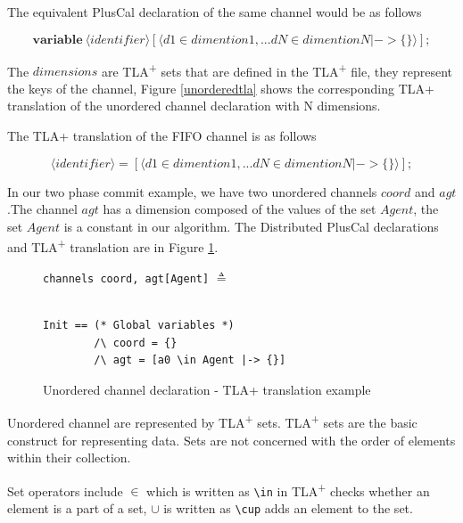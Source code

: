 \documentclass{thesul}
\newcommand{\tlaplus}{TLA\textsuperscript{+}\xspace}
\newcommand{\keyword}[1]{\textbf{#1}}
\newcommand{\entity}[1]{\ensuremath{\langle}#1\ensuremath{\rangle}}
\begin{document}
The equivalent PlusCal declaration of the same channel would be as follows

\[
 \keyword{variable}\ \entity{identifier}[\entity{d1 \in dimention1,... dN \in dimentionN |-> \{\}}];
\]

The $dimensions$ are \tlaplus sets that are defined in the \tlaplus file, they represent the keys of the channel, Figure \ref{unorderedtla} shows the corresponding TLA+ translation of the unordered channel declaration with N dimensions.



The TLA+ translation of the FIFO channel is as follows

\[
 \entity{identifier} = [\entity{d1 \in dimention1,... dN \in dimentionN |-> \{ \}}];
\]

In our two phase commit example, we have two unordered channels $coord$ and $agt$.The channel $agt$ has a dimension composed of the values of the set $Agent$, the set $Agent$ is a constant in our algorithm. The Distributed PlusCal declarations and \tlaplus translation are in Figure \ref{2pcchannels}.


\FloatBarrier
\begin{figure}[!h]

\begin{minipage}{.3\textwidth}

\lstinline|channels coord, agt[Agent]| $\triangleq$ \\\\
\end{minipage}\hfill
\begin{minipage}{.7\textwidth}
\begin{lstlisting}[frame = none, numbers = none]
Init == (* Global variables *)
        /\ coord = {}
        /\ agt = [a0 \in Agent |-> {}]
\end{lstlisting}

\end{minipage}\hfill

\caption{Unordered channel declaration - TLA+ translation example}
\label{2pcchannels}
\end{figure}
\FloatBarrier

Unordered channel are represented by \tlaplus sets. \tlaplus sets are the basic construct for representing data. Sets are not concerned with the order of elements within their collection.

Set operators include $\in$ which is written as \lstinline|\in| in \tlaplus checks whether an element is a part of a set, $\cup$ is written as \lstinline|\cup| adds an element to the set.
\end{document}
